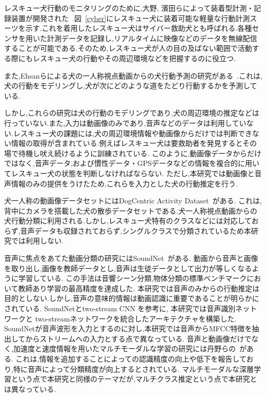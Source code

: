 \documentclass[MIRU,submit]{miru2019j}
\begin{document}
レスキュー犬行動のモニタリングのために,大野, 濱田らによって装着型計測・記録装置が開発された~\cite{dog01}.図~\ref{cyber}にレスキュー犬に装着可能な軽量な行動計測スーツを示す.これを着用したレスキュー犬はサイバー救助犬とも呼ばれる.各種センサを用いた計測データを記録し,リアルタイムに映像などのデータを無線配信することが可能である.そのため,レスキュー犬が人の目の及ばない範囲で活動する際にもレスキュー犬の行動やその周辺環境などを把握するのに役立つ.

また,Ehsanらによる犬の一人称視点動画からの犬行動予測の研究がある~\cite{whoretthedog}.これは,犬の行動をモデリングし,犬が次にどのような道をたどり行動するかを予測している.

しかし,これらの研究は犬の行動のモデリングであり,犬の周辺環境の推定などは行っていない.また,入力は動画像のみであり,音声などのデータは利用していない.レスキュー犬の課題には,犬の周辺環境情報や動画像からだけでは判断できない情報の取得が含まれている.例えばレスキュー犬は要救助者を発見するとその場で待機し吠え続けるように訓練されている.
このように,動画像データからだけではなく,音声データ,および慣性データ・GPSデータなどの情報を複合的に用いてレスキュー犬の状態を判断しなければならない.
ただし,本研究では動画像と音声情報のみの提供をうけたため,これらを入力とした犬の行動推定を行う.

犬一人称の動画像データセットにはDogCentric Activity Dataset~\cite{yumi2014first}がある.
これは,背中にカメラを搭載した犬の散歩データセットである.犬一人称視点動画からの犬行動分類に利用される.しかし,レスキュー犬特有のクラスなどには対応しておらず,音声データも収録されておらず,シングルクラスで分類されているため本研究では利用しない.

音声に焦点をあてた動画分類の研究にはSoundNet~\cite{aytar2016soundnet}がある.
動画から音声と画像を取り出し,画像を教師データとし,音声は生徒データとして出力が等しくなるように学習している.
この手法は音響シーン分類,物体分類の標準ベンチマークにおいて教師あり学習の最高精度を達成した.
本研究では音声のみからの行動推定は目的としない.しかし,音声の意味的情報は動画認識に重要であることが明らかにされている.
SoundNetとtwo-stream CNN を参考に, 本研究では音声識別ネットワークと two-streamネットワークを統合したアーキテクチャを構築した.
SoundNetが音声波形を入力とするのに対し,本研究では音声からMFCC特徴を抽出してからストリームへの入力とする点で異なっている.
音声と動画像だけでなく,加速度と速度情報を用いたマルチモーダルな学習の研究には丹野らの~\cite{tanno2019deim}がある.
これは,情報を追加することによっての認識精度の向上や低下を報告しており,特に音声によって分類精度が向上するとされている.
マルチモーダルな深層学習という点で本研究と同様のテーマだが,マルチクラス推定という点で本研究とは異なっている.
\end{document}

